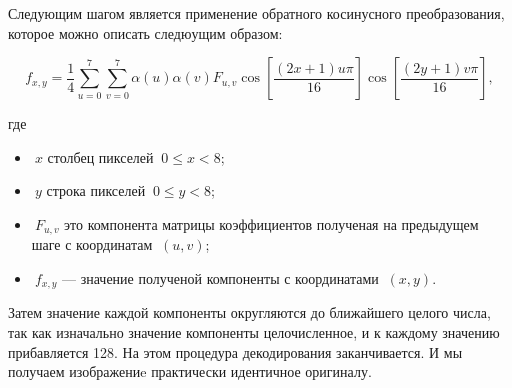 \documentclass{matmex-diploma-custom}
\begin{document}
Следующим шагом является применение обратного косинусного преобразования, которое можно описать следюущим образом:


$$f_{x,y} =
 \frac{1}{4}
 \sum_{u=0}^7
 \sum_{v=0}^7
 \alpha(u) \alpha(v) F_{u,v}
 \cos \left[\frac{(2x+1)u\pi}{16} \right]
 \cos \left[\frac{(2y+1)v\pi}{16} \right]
,
$$

где

\begin{itemize}
\item{
$\ x$ столбец пикселей $\ 0 \leq x < 8$;
}
\item{
$\ y$ строка пикселей $\ 0 \leq y < 8$;
}
\item{
$\ F_{u,v}$ это компонента матрицы коэффициентов полученая на предыдущем шаге с координатам $\ (u,v)$;
}
\item{
$\ f_{x,y}$ --- значение полученой компоненты с координатами $\ (x,y)$.
}
\end{itemize}

Затем значение каждой компоненты округляются до ближайшего целого числа, так как изначально значение компоненты целочисленное, и к каждому значению прибавляется 128. На этом процедура декодирования заканчивается. И мы получаем изображениe практически идентичное оригиналу.








\end{document}
